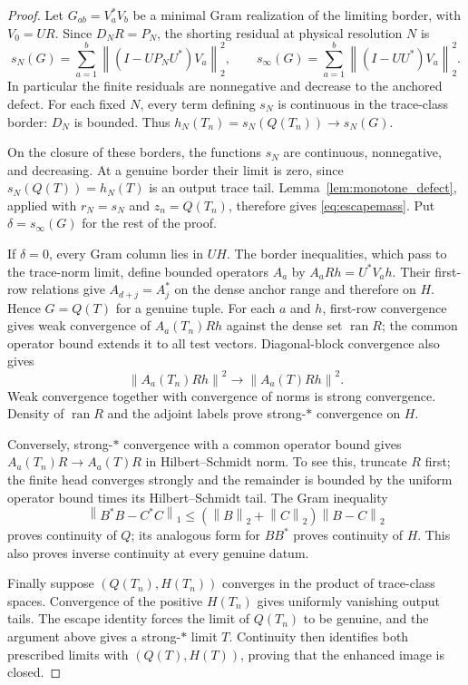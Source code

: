 \documentclass[11pt,a4paper]{amsart}
\numberwithin{equation}{section}
\theoremstyle{definition}
\theoremstyle{remark}
\DeclareMathOperator{\ran}{ran}
\newcommand{\norm}[1]{\left\lVert#1\right\rVert}
\begin{document}
\begin{proof}
Let $G_{ab}=V_a^*V_b$ be a minimal Gram realization of the limiting border, with $V_0=UR$. Since $D_NR=P_N$, the shorting residual at physical resolution $N$ is
\[
 s_N(G)=\sum_{a=1}^b\norm{(I-UP_NU^*)V_a}_2^2,
 \qquad
 s_\infty(G)=\sum_{a=1}^b\norm{(I-UU^*)V_a}_2^2.
\]
In particular the finite residuals are nonnegative and decrease to the anchored defect. For each fixed $N$, every term defining $s_N$ is continuous in the trace-class border: $D_N$ is bounded. Thus
$h_N(T_n)=s_N(Q(T_n))\to s_N(G)$.

On the closure of these borders, the functions $s_N$ are continuous, nonnegative, and decreasing. At a genuine border their limit is zero, since $s_N(Q(T))=h_N(T)$ is an output trace tail. Lemma~\ref{lem:monotone_defect}, applied with $r_N=s_N$ and $z_n=Q(T_n)$, therefore gives \eqref{eq:escapemass}. Put $\delta=s_\infty(G)$ for the rest of the proof.

If $\delta=0$, every Gram column lies in $UH$. The border inequalities, which pass to the trace-norm limit, define bounded operators $A_a$ by $A_aRh=U^*V_ah$. Their first-row relations give $A_{d+j}=A_j^*$ on the dense anchor range and therefore on $H$. Hence $G=Q(T)$ for a genuine tuple. For each $a$ and $h$, first-row convergence gives weak convergence of $A_a(T_n)Rh$ against the dense set $\ran R$; the common operator bound extends it to all test vectors. Diagonal-block convergence also gives
\[
 \norm{A_a(T_n)Rh}^2\longrightarrow\norm{A_a(T)Rh}^2.
\]
Weak convergence together with convergence of norms is strong convergence. Density of $\ran R$ and the adjoint labels prove strong-$*$ convergence on $H$.

Conversely, strong-$*$ convergence with a common operator bound gives $A_a(T_n)R\to A_a(T)R$ in Hilbert--Schmidt norm. To see this, truncate $R$ first; the finite head converges strongly and the remainder is bounded by the uniform operator bound times its Hilbert--Schmidt tail. The Gram inequality
\[
 \norm{B^*B-C^*C}_1\le(\norm B_2+\norm C_2)\norm{B-C}_2
\]
proves continuity of $Q$; its analogous form for $BB^*$ proves continuity of $H$. This also proves inverse continuity at every genuine datum.

Finally suppose $(Q(T_n),H(T_n))$ converges in the product of trace-class spaces. Convergence of the positive $H(T_n)$ gives uniformly vanishing output tails. The escape identity forces the limit of $Q(T_n)$ to be genuine, and the argument above gives a strong-$*$ limit $T$. Continuity then identifies both prescribed limits with $(Q(T),H(T))$, proving that the enhanced image is closed.
\end{proof}
\end{document}
